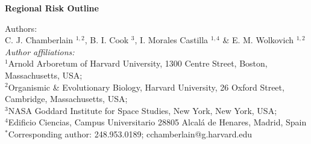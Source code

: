 \documentclass{article}\usepackage[]{graphicx}\usepackage[]{color}
\begin{document}
\noindent \textbf{\Large{Regional Risk Outline}}

\noindent Authors:\\
C. J. Chamberlain $^{1,2}$, B. I. Cook $^{3}$, I. Morales Castilla $^{1,4}$ \& E. M. Wolkovich $^{1,2}$
\vspace{2ex}\\
\emph{Author affiliations:}\\
$^{1}$Arnold Arboretum of Harvard University, 1300 Centre Street, Boston, Massachusetts, USA; \\
$^{2}$Organismic \& Evolutionary Biology, Harvard University, 26 Oxford Street, Cambridge, Massachusetts, USA; \\
$^{3}$NASA Goddard Institute for Space Studies, New York, New York, USA; \\
$^{4}$Edificio Ciencias, Campus Universitario 28805 Alcalá de Henares, Madrid, Spain \\
\vspace{2ex}
$^*$Corresponding author: 248.953.0189; cchamberlain@g.harvard.edu\\

\renewcommand{\thetable}{\arabic{table}}
\renewcommand{\thefigure}{\arabic{figure}}
\renewcommand{\labelitemi}{$-$}


\end{document}
